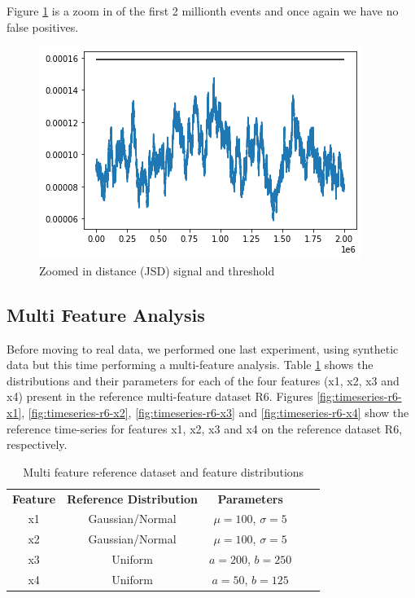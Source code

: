 Figure \ref{fig:JSD-signal-zoom-test05} is a zoom in of the first 2 millionth events and once again we have no false positives.
\begin{figure}[!htb]
    \begin{center}
      \includegraphics[scale=0.6]{figures/stream-analysis-viz-zoom-test05.png}
      \caption[]{Zoomed in distance (JSD) signal and threshold}
      \label{fig:JSD-signal-zoom-test05}
    \end{center}
\end{figure}

\subsection{Multi Feature Analysis}
Before moving to real data, we performed one last experiment, using synthetic data but this time performing a multi-feature analysis. Table \ref{tbl:multi-feat-ref-dataset-distros} shows the distributions and their parameters for each of the four features (x1, x2, x3 and x4) present in the reference multi-feature dataset R6. Figures \ref{fig:timeseries-r6-x1}, \ref{fig:timeseries-r6-x2}, \ref{fig:timeseries-r6-x3} and \ref{fig:timeseries-r6-x4} show the reference time-series for features x1, x2, x3 and x4 on the reference dataset R6, respectively.

\begin{table}[!htb]
    \begin{center}
        \begin{tabular}{|c|c|c|ll}
        \cline{1-3}
        \textbf{Feature} & \textbf{Reference Distribution} & \textbf{Parameters} &  &  \\ \cline{1-3}
        x1               & Gaussian/Normal                 & $\mu=100$, $\sigma=5$  &  &  \\ \cline{1-3}
        x2               & Gaussian/Normal                 & $\mu=100$, $\sigma=5$  &  &  \\ \cline{1-3}
        x3               & Uniform                         & $a=200$, $b=250$       &  &  \\ \cline{1-3}
        x4               & Uniform                         & $a=50$, $b=125$        &  &  \\ \cline{1-3}
        \end{tabular}
    \end{center}
    \caption{Multi feature reference dataset and feature distributions}
    \label{tbl:multi-feat-ref-dataset-distros}
\end{table}


